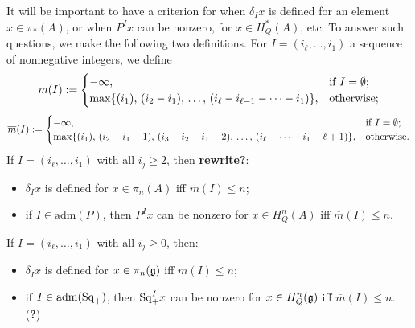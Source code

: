 \documentclass[10pt]{article}
\newcommand{\admis}[1]{\mathrm{adm}(#1)}%
\newcommand{\SqShift}{\Sq_{\smash{+}}}
\newcommand{\Sq}{\mathrm{Sq}}
\newcommand{\minDim}{m}
\newcommand{\minDimP}{\overline{m}}
\begin{document}
\begin{SteenrodAlgebrasAndTheirKoszulDuals}
It will be important to have a criterion for when $\delta_Ix$ is defined for an element $x\in\pi_*(A)$, or when $P^Ix$ can be nonzero, for $x\in H^*_Q(A)$, etc.
To answer such questions, we make the following two definitions. For $I=(i_\ell,\ldots,i_1)$ a sequence of nonnegative integers, we define
\[\minDim(I):=\begin{cases}
-\infty,&\textup{if }I=\emptyset;\\
\max\{(i_1),\,(i_2-i_1),\,\ldots,\,(i_{\ell}-i_{\ell-1}-\cdots -i_1)\},&\textup{otherwise};
\end{cases}
\]
\[\minDimP(I):=\begin{cases}
-\infty,&\textup{if }I=\emptyset;\\
\max\{(i_1),\,(i_2-i_1-1),\,(i_3-i_2-i_1-2),\,\ldots,\,(i_{\ell}-\cdots-i_1-\ell+1)\},&\textup{otherwise}.
\end{cases}
\]
If $I=(i_{\ell},\ldots,i_1)$ with all $i_j\geq2$, then \textbf{rewrite?}:
\begin{itemize}
\setlength{\parindent}{.25in}
\squishlist
\item $\delta_Ix$ is defined for $x\in \pi_n(A)$ iff $\minDim(I)\leq n$;
\item if $I\in\admis{P}$, then $P^Ix$ can be nonzero for $x\in H^n_Q(A)$ iff $\minDimP(I)\leq n$.
\end{itemize}
If $I=(i_{\ell},\ldots,i_1)$ with all $i_j\geq0$, then:
\begin{itemize}
\setlength{\parindent}{.25in}
\squishlist
\item $\delta_Ix$ is defined for $x\in \pi_n(\mathfrak{g})$ iff $\minDim(I)\leq n$;
\item if $I\in\admis{\SqShift}$, then $\SqShift^Ix$ can be nonzero for $x\in H^n_Q(\mathfrak{g})$ iff $\minDimP(I)\leq n$. (\textbf{?})
\end{itemize}


\end{SteenrodAlgebrasAndTheirKoszulDuals}
\end{document}
